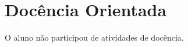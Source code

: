 \chapter{Docência Orientada}\label{ch:introducao}


O aluno não participou de atividades de docência.